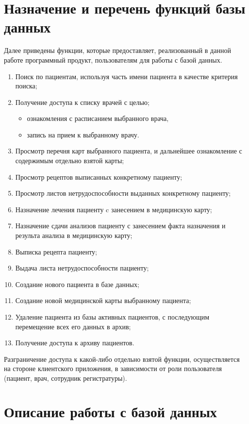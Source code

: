 \documentclass[14pt,a4paper,russian]{extreport}
\begin{document}
\section{Назначение и перечень функций базы данных}
Далее приведены функции, которые предоставляет, реализованный в данной работе программный продукт, пользователям для работы с базой данных.
\begin{enumerate}
	\item Поиск по пациентам, используя часть имени пациента в качестве критерия поиска;
	\item Получение доступа к списку врачей с целью;
		\begin{itemize}
				\renewcommand\labelitemi{--}
			\item ознакомления с расписанием выбранного врача,
			\item запись на прием к выбранному врачу.
		\end{itemize}
	\item Просмотр перечня карт выбранного пациента, и дальнейшее ознакомление с содержимым отдельно взятой карты;
	\item Просмотр рецептов выписанных конкретному пациенту;
	\item Просмотр листов нетрудоспособности выданных конкретному пациенту;
	\item Назначение лечения пациенту c занесением в медицинскую карту;
	\item Назначение сдачи анализов пациенту с занесением факта назначения и результа анализа в медицинскую карту;
	\item Выписка рецепта пациенту;
	\item Выдача листа нетрудоспособности пациенту;
	\item Создание нового пациента в базе данных;
	\item Создание новой медицинской карты выбранному пациента;
	\item Удаление пациента из базы активных пациентов, с последующим перемещение всех его данных в архив;
	\item Получение доступа к архиву пациентов.
\end{enumerate}
\cleardoublepage
Разграничение доступа к какой-либо отдельно взятой функции, осуществляется на стороне клиентского приложения, в зависимости от роли пользователя (пациент, врач, сотрудник регистратуры).

\section{Описание работы с базой данных}
\end{document}
